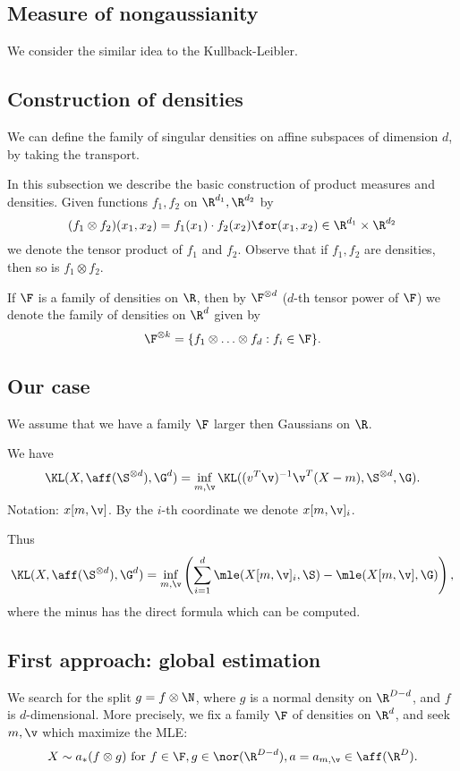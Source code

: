 

\subsection{Measure of nongaussianity}

We consider the similar idea to the Kullback-Leibler.

\subsection{Construction of densities}

We can define the family of singular densities on affine subspaces of 
dimension $d$, by taking the transport.


In this subsection we describe the basic construction of product measures and densities. Given functions $f_1,f_2$ on $\R^{d_1},\R^{d_2}$ by 
$$
(f_1 \otimes f_2)(x_1,x_2)=f_1(x_1) \cdot f_2(x_2) \for (x_1,x_2) \in \R^{d_1} 
\times \R^{d_2}
$$ 
we denote the tensor
product of $f_1$ and $f_2$. Observe that if $f_1,f_2$ are densities, then so is
$f_1 \otimes f_2$.

If $\F$ is a family of densities on $\R$, then by $\F^{\otimes d}$ ($d$-th tensor power of $\F$) we denote
the family of densities on $\R^d$ given by
$$
\F^{\otimes k}=\{f_1 \otimes \ldots \otimes f_d : f_i \in \F\}.
$$




\subsection{Our case}

We assume that we have a family $\F$ larger then Gaussians on $\R$.

We have
$$
\KL(X,\aff(\S^{\otimes d}),\G^d)=\inf_{m,\v} \KL((v^T\v)^{-1}\v^T(X-m),\S^{\otimes d},\G).
$$
Notation: $x[m,\v]$. By the $i$-th coordinate we denote $x[m,\v]_i$.

Thus 
$$
\KL(X,\aff(\S^{\otimes d}),\G^d)=\inf_{m,\v} \left( \sum_{i=1}^d \mle(X[m,\v]_i,\S)
-\mle(X[m,\v],\G)
\right),
$$
where the minus has the direct formula which can be computed.

\subsection{First approach: global estimation}

We search for the split $g=f \otimes \N$, where $g$ is a normal density on $\R^{D-d}$,
and $f$ is $d$-dimensional. More precisely, we fix a family $\F$ of densities on $\R^d$, and seek $m,\v$ which maximize the MLE:
$$
X \sim a_*(f \otimes g) \text{ for } f \in \F, g \in \nor(\R^{D-d}), a=a_{m,\v} \in \aff(\R^D). 
$$

